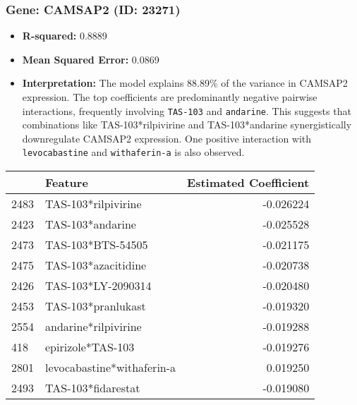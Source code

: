 \documentclass[12pt]{article}
\begin{document}
\subsubsection{Gene: CAMSAP2 (ID: 23271)}
\begin{itemize}
    \item \textbf{R-squared:} 0.8889
    \item \textbf{Mean Squared Error:} 0.0869
    \item \textbf{Interpretation:} The model explains 88.89\% of the variance in CAMSAP2 expression. The top coefficients are predominantly negative pairwise interactions, frequently involving \texttt{TAS-103} and \texttt{andarine}. This suggests that combinations like TAS-103*rilpivirine and TAS-103*andarine synergistically downregulate CAMSAP2 expression. One positive interaction with \texttt{levocabastine} and \texttt{withaferin-a} is also observed.
\end{itemize}
\begin{tabularx}{\textwidth}{l X r}
\toprule
{} & Feature & Estimated Coefficient \\
\midrule
2483 & TAS-103*rilpivirine & -0.026224 \\
2423 & TAS-103*andarine & -0.025528 \\
2473 & TAS-103*BTS-54505 & -0.021175 \\
2475 & TAS-103*azacitidine & -0.020738 \\
2426 & TAS-103*LY-2090314 & -0.020480 \\
2453 & TAS-103*pranlukast & -0.019320 \\
2554 & andarine*rilpivirine & -0.019288 \\
418 & epirizole*TAS-103 & -0.019276 \\
2801 & levocabastine*withaferin-a & 0.019250 \\
2493 & TAS-103*fidarestat & -0.019080 \\
\bottomrule
\end{tabularx}
\end{document}
